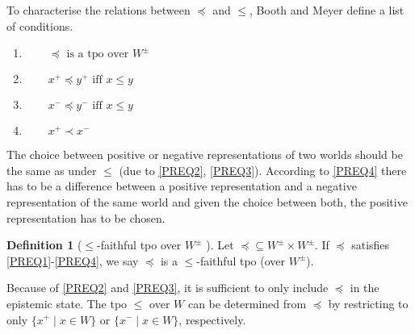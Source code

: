 \documentclass[english, 12pt]{scrartcl}
\theoremstyle{definition}
\theoremstyle{definition}
\newtheorem{definition}{Definition}
\theoremstyle{definition}
\begin{document}
To characterise the relations between $\preceq$ and $\leq$, Booth and Meyer define a list of conditions.

\begin{enumerate}[wide=0pt, widest=99,leftmargin=\parindent,label = ($\preceq\arabic*$)]
    \item\label{PREQ1} $\qquad \preceq \textrm{ is a tpo over } W^{\pm}$
    \item\label{PREQ2} $\qquad x^{+} \preceq y^{+} \textrm{ iff } x \leq y$
    \item\label{PREQ3} $\qquad x^{-} \preceq y^{-} \textrm{ iff } x \leq y$
    \item\label{PREQ4} $\qquad x^{+} \prec x^{-}$
\end{enumerate}

The choice between positive or negative representations of two worlds should be the same as under $\leq$ (due to \ref{PREQ2}, \ref{PREQ3}). According to \ref{PREQ4} there has to be a difference between a positive representation and a negative representation of the same world and given the choice between both, the positive representation has to be chosen.

\begin{definition}[$\leq$-faithful tpo over $W^{\pm}$ \cite{Booth2011}]
\label{definition:faithful-tpo}Let $\preceq \subseteq W^{\pm} \times W^{\pm}$. If $\preceq$ satisfies \ref{PREQ1}-\ref{PREQ4}, we say $\preceq$ is a $\leq$-faithful tpo (over $W^{\pm}$).
\end{definition}

Because of \ref{PREQ2} and \ref{PREQ3}, it is sufficient to only include $\preceq$ in the epistemic state. The tpo $\leq$ over $W$ can be determined from $\preceq$ by restricting to only $\{ x^{+} \mid x \in W\}$ or $\{ x^{-} \mid x \in W\}$, respectively.
\end{document}
